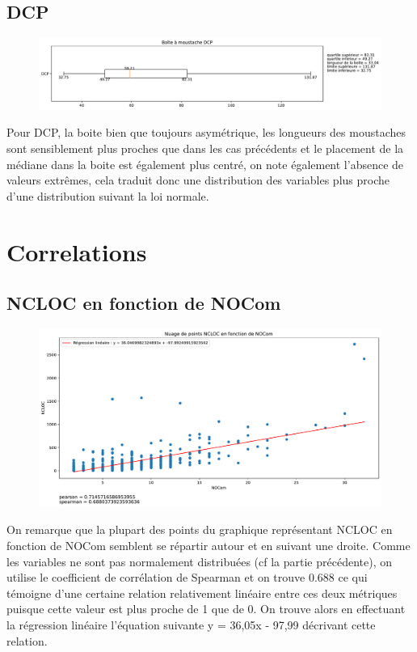 \documentclass[11pt]{rapport-tp-qlm}
\begin{document}
    \section{DCP}
    \begin{figure}[h]
    \includegraphics[scale=0.5]{assets/moustache_DCP}
    \centering
    \end{figure}
  Pour DCP, la boite bien que toujours asymétrique, les longueurs des moustaches sont sensiblement plus proches que dans les cas précédents et le placement de la médiane dans la boite est également plus centré, on note également l'absence de valeurs extrêmes, cela traduit donc une distribution des variables plus proche d'une distribution suivant la loi normale.
  
\chapter{Correlations}
    \section{NCLOC en fonction de NOCom}
    \begin{figure}[h]
    \includegraphics[scale=0.5]{assets/relation_NCLOC_NOCom}
    \centering
    \end{figure}
    On remarque que la plupart des points du graphique représentant NCLOC en fonction de NOCom semblent se répartir autour et en suivant une droite. Comme les variables ne sont pas normalement distribuées (cf la partie précédente), on utilise le coefficient de corrélation de Spearman et on trouve 0.688 ce qui témoigne d'une certaine relation relativement linéaire entre ces deux métriques puisque cette valeur est plus proche de 1 que de 0. On trouve alors en effectuant la régression linéaire l'équation suivante y = 36,05x - 97,99 décrivant cette relation.
     \newpage
\end{document}
